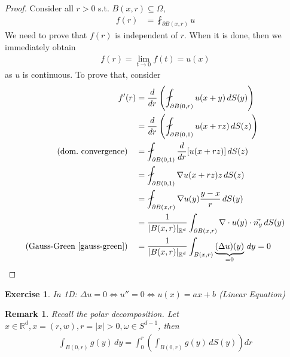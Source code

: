 \documentclass{report}
\theoremstyle{tommy}
\newtheorem{rem}[defn]{Remark}
\newtheorem{ex}[defn]{Exercise}
\begin{document}
\begin{proof}
  Consider all \(r > 0\) s.t. \(B(x,r) \subseteq \Omega\),
  \begin{align*}
    f(r) &= \fint_{\partial B(x,r)} u
  \end{align*}
  We need to prove that \(f(r)\) is independent of \(r\). When it is done, then we immediately obtain
  \begin{align*}
    f(r) = \lim_{t \to 0} f(t) = u(x)
  \end{align*}
  as \(u\) is continuous. To prove that, consider
  \begin{align*}
    f'(r) 
    &= \frac{d}{dr} \left(\fint_{\partial B(0, r)} u(x+y) \, dS(y) \right) \\
    &= \frac{d}{dr} \left(\fint_{\partial B(0, 1)} u(x + rz) \, dS(z) \right) \\
    \text{(dom.\ convergence)} \quad & = \fint_{\partial B(0, 1)} \frac{d}{dr} [u(x + rz)] \, dS(z) \\
    &= \fint_{\partial B(0, 1)} \nabla u(x + rz) z \, dS(z) \\
    &= \fint_{\partial B(x, r)} \nabla u(y) \frac{y-x}{r} \, dS(y) \\
    &= \frac{1}{|B(x, r)|_{\mathbb{R}^d}} \int_{\partial B(x, r)} \nabla \cdot u(y) \cdot \vec{n_y} \, dS(y) \\
    \text{(Gauss-Green \ref{gauss-green})} \quad &= \frac{1}{|B(x, r)|_{\mathbb{R}^d}} \int_{B(x, r)} \underbrace{(\Delta u)(y)}_{= 0} \, dy = 0 \qedhere
  \end{align*}
\end{proof}

\begin{ex}
  In 1D\@: \(\Delta u = 0 \Leftrightarrow u'' = 0 \Leftrightarrow u(x) = ax + b\) (Linear Equation)
\end{ex}

\begin{rem}
  Recall the polar decomposition. Let \(x \in \mathbb{R}^d, x = (r,w), r = |x| > 0, \omega \in S^{d-1}\), then
  \begin{align*}
    \int_{B(0, r)} g(y) \, dy = \int_0^r \left(\int_{B(0, r)} g(y) \, dS(y) \right) dr
  \end{align*}
\end{rem}
\end{document}
